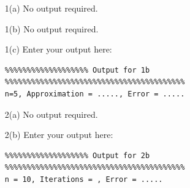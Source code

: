 \documentclass[a4,10pt, fleqn]{article}  %
\begin{document}
\begin{enumerate}

\item[1(a)] No output required.
\item[1(b)] No output required.
\item[1(c)] Enter your output here:
\begin{verbatim}
%%%%%%%%%%%%%%%%%%% Output for 1b %%%%%%%%%%%%%%%%%%%%%%%%%%%%%%%%%%%%%%%%%
n=5, Approximation = ....., Error = .....

\end{verbatim}

\item[2(a)] No output required.
\item[2(b)] Enter your output here:

\begin{verbatim}
%%%%%%%%%%%%%%%%%%% Output for 2b %%%%%%%%%%%%%%%%%%%%%%%%%%%%%%%%%%%%%%%%%
n = 10, Iterations = , Error = .....

\end{verbatim}


\end{enumerate}
\end{document}
